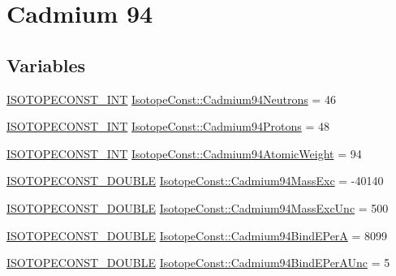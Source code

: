 \hypertarget{group___isotope_const-_cadmium-_cd94}{}\section{Cadmium 94}
\label{group___isotope_const-_cadmium-_cd94}
\subsection*{Variables}
\begin{DoxyCompactItemize}
\item 
\mbox{\hyperlink{group___isotope_const-_macros_ga5f18360b3e99483a35c32d789e62621c}{I\+S\+O\+T\+O\+P\+E\+C\+O\+N\+S\+T\+\_\+\+I\+NT}} \mbox{\hyperlink{group___isotope_const-_cadmium-_cd94_ga2e2c3f5dce1b6977fc4bd7008cb15179}{Isotope\+Const\+::\+Cadmium94\+Neutrons}} = 46
\item 
\mbox{\hyperlink{group___isotope_const-_macros_ga5f18360b3e99483a35c32d789e62621c}{I\+S\+O\+T\+O\+P\+E\+C\+O\+N\+S\+T\+\_\+\+I\+NT}} \mbox{\hyperlink{group___isotope_const-_cadmium-_cd94_ga41aba07faf82f8909917ba55550731c6}{Isotope\+Const\+::\+Cadmium94\+Protons}} = 48
\item 
\mbox{\hyperlink{group___isotope_const-_macros_ga5f18360b3e99483a35c32d789e62621c}{I\+S\+O\+T\+O\+P\+E\+C\+O\+N\+S\+T\+\_\+\+I\+NT}} \mbox{\hyperlink{group___isotope_const-_cadmium-_cd94_ga12e3d4bb8cd491734ddcb7977f23982a}{Isotope\+Const\+::\+Cadmium94\+Atomic\+Weight}} = 94
\item 
\mbox{\hyperlink{group___isotope_const-_macros_ga8f45a7272ce02c0b4c65c44636ed719a}{I\+S\+O\+T\+O\+P\+E\+C\+O\+N\+S\+T\+\_\+\+D\+O\+U\+B\+LE}} \mbox{\hyperlink{group___isotope_const-_cadmium-_cd94_ga677b0f4da3ba7f73ec68c16529d8c6d1}{Isotope\+Const\+::\+Cadmium94\+Mass\+Exc}} = -\/40140
\item 
\mbox{\hyperlink{group___isotope_const-_macros_ga8f45a7272ce02c0b4c65c44636ed719a}{I\+S\+O\+T\+O\+P\+E\+C\+O\+N\+S\+T\+\_\+\+D\+O\+U\+B\+LE}} \mbox{\hyperlink{group___isotope_const-_cadmium-_cd94_ga6c264c5dc4a6ef9f13702c27f0f211e4}{Isotope\+Const\+::\+Cadmium94\+Mass\+Exc\+Unc}} = 500
\item 
\mbox{\hyperlink{group___isotope_const-_macros_ga8f45a7272ce02c0b4c65c44636ed719a}{I\+S\+O\+T\+O\+P\+E\+C\+O\+N\+S\+T\+\_\+\+D\+O\+U\+B\+LE}} \mbox{\hyperlink{group___isotope_const-_cadmium-_cd94_gaa4b23343f480d5318e4f3336a0ad7ef3}{Isotope\+Const\+::\+Cadmium94\+Bind\+E\+PerA}} = 8099
\item 
\mbox{\hyperlink{group___isotope_const-_macros_ga8f45a7272ce02c0b4c65c44636ed719a}{I\+S\+O\+T\+O\+P\+E\+C\+O\+N\+S\+T\+\_\+\+D\+O\+U\+B\+LE}} \mbox{\hyperlink{group___isotope_const-_cadmium-_cd94_ga953326bd12dbf5db79dffc0a4104da17}{Isotope\+Const\+::\+Cadmium94\+Bind\+E\+Per\+A\+Unc}} = 5

\end{DoxyCompactItemize}

